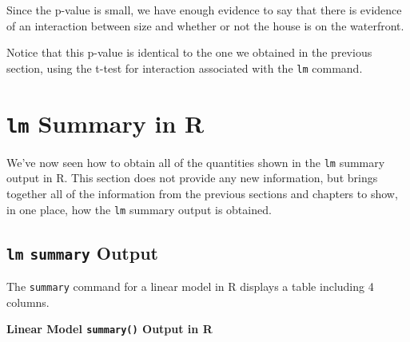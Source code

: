\documentclass[
  letterpaper,
  DIV=11,
  numbers=noendperiod]{scrreprt}
\begin{document}
Since the p-value is small, we have enough evidence to say that there is
evidence of an interaction between size and whether or not the house is
on the waterfront.

Notice that this p-value is identical to the one we obtained in the
previous section, using the t-test for interaction associated with the
\texttt{lm} command.

\section{\texorpdfstring{\texttt{lm} Summary in
R}{lm Summary in R}}\label{lm-summary-in-r}

We've now seen how to obtain all of the quantities shown in the
\texttt{lm} summary output in R. This section does not provide any new
information, but brings together all of the information from the
previous sections and chapters to show, in one place, how the
\texttt{lm} summary output is obtained.

\subsection{\texorpdfstring{\texttt{lm} \texttt{summary}
Output}{lm summary Output}}\label{lm-summary-output}

The \texttt{summary} command for a linear model in R displays a table
including 4 columns.

\textbf{Linear Model \texttt{summary()} Output in R}
\end{document}
